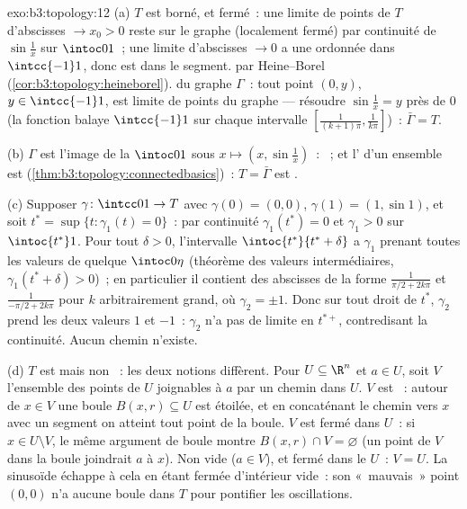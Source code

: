 \begin{solution}{exo:b3:topology:12}
(a) $T$ est borné, et fermé~: une limite de points de $T$
d'abscisses $\to x_0 > 0$ reste sur le graphe (localement
fermé) par continuité de $\sin\frac1x$ sur $\intoc01$~; une
limite d'abscisses $\to 0$ a une ordonnée dans
$\intcc{-1}1$, donc est dans le segment.  par
Heine--Borel (\cref{cor:b3:topology:heineborel}).  du
graphe $\Gamma$~: tout point $(0, y)$, $y \in \intcc{-1}1$,
est limite de points du graphe --- résoudre $\sin\frac1x = y$
près de $0$ (la fonction balaye $\intcc{-1}1$ sur chaque
intervalle $[\frac1{(k+1)\pi}, \frac1{k\pi}]$)~: $\bar\Gamma =
T$.

(b) $\Gamma$ est l'image  de la  $\intoc01$
sous $x \mapsto (x, \sin\frac1x)$~: ~; et l'
d'un ensemble  est 
(\cref{thm:b3:topology:connectedbasics})~: $T = \bar\Gamma$
est .

(c) Supposer $\gamma\colon\intcc01\to T$  avec
$\gamma(0) = (0,0)$, $\gamma(1) = (1, \sin1)$, et soit $t^*
= \sup\{t : \gamma_1(t) = 0\}$~: par continuité
$\gamma_1(t^*) = 0$ et $\gamma_1 > 0$ sur $\intoc{t^*}1$.
Pour tout $\delta > 0$, l'intervalle $\intoc{t^*}{t^*+\delta}$
a $\gamma_1$ prenant toutes les valeurs de quelque
$\intoc0\eta$ (théorème des valeurs intermédiaires,
$\gamma_1(t^* + \delta) > 0$)~; en particulier il contient
des abscisses de la forme $\frac1{\pi/2 + 2k\pi}$ et
$\frac1{-\pi/2 + 2k\pi}$ pour $k$ arbitrairement grand, où
$\gamma_2 = \pm1$. Donc sur tout  droit de $t^*$,
$\gamma_2$ prend les deux valeurs $1$ et $-1$~: $\gamma_2$
n'a pas de limite en $t^{*+}$, contredisant la continuité.
Aucun chemin n'existe.

(d) $T$ est  mais non ~: les deux
notions diffèrent. Pour $U \subseteq \R^n$   et
$a \in U$, soit $V$ l'ensemble des points de $U$ joignables à
$a$ par un chemin dans $U$. $V$ est ~: autour de $x \in
V$ une boule $B(x, r) \subseteq U$ est étoilée, et en
concaténant le chemin vers $x$ avec un segment on atteint
tout point de la boule. $V$ est fermé dans $U$~: si $x \in U
\setminus V$, le même argument de boule montre $B(x, r) \cap
V = \varnothing$ (un point de $V$ dans la boule joindrait $a$
à $x$). Non vide ($a \in V$),  et fermé dans le 
$U$~: $V = U$. La sinusoïde échappe à cela en étant fermée
d'intérieur vide~: son «~mauvais~» point $(0,0)$ n'a aucune
boule dans $T$ pour pontifier les oscillations.


\end{solution}
